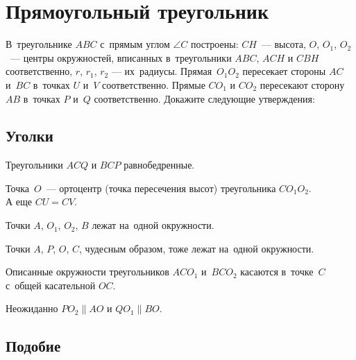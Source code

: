 
\section*{Прямоугольный треугольник}



В~треугольнике $ABC$ с~прямым углом $\angle C$ построены:
$CH$~--- высота,
$O$, $O_1$, $O_2$~--- центры окружностей, вписанных в~треугольники
$ABC$, $ACH$ и $CBH$ соответственно,
$r$, $r_1$, $r_2$ --- их~радиусы.
Прямая~$O_1 O_2$ пересекает стороны $AC$ и~$BC$ в~точках $U$ и~$V$
соответственно.
Прямые $C O_1$ и $C O_2$ пересекают сторону~$AB$ в~точках $P$ и~$Q$
соответственно.
Докажите следующие утверждения:

\subsection*{Уголки}

\begin{problems}

\item
Треугольники $ACQ$ и $BCP$ равнобедренные.

\item
\sp
Точка~$O$~--- ортоцентр (точка пересечения высот) треугольника $C O_1 O_2$.
\\
\sp
А еще $CU = CV$.

\item
Точки $A$, $O_1$, $O_2$, $B$ лежат на~одной окружности.

\item
Точки $A$, $P$, $O$, $C$, чудесным образом, тоже лежат на~одной окружности.

\item
Описанные окружности треугольников $A C O_1$ и~$B C O_2$ касаются в~точке~$C$
с~общей касательной $OC$.

\item
Неожиданно $P O_2 \parallel A O$ и $Q O_1 \parallel B O$.

\end{problems}


\subsection*{Подобие}

